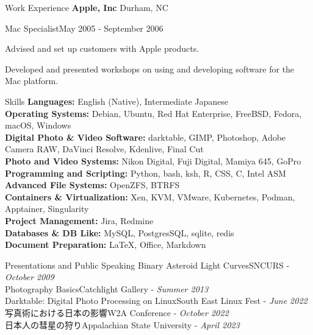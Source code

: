 \documentclass{new_cv} %
\begin{document}
\begin{rSection}{Work Experience}
  {\bf {Apple, Inc}} \hfill { Durham, NC}
   
    \begin{rSubsection}{Mac Specialist}{May 2005 - September 2006}
   	\item Advised and set up customers with Apple products.
   	\item Developed and presented workshops on using and developing software for the Mac platform.
   \end{rSubsection}
   
   \end{rSection}
   


\begin{rSection}{Skills}
	{\bf Languages:} English (Native),  Intermediate Japanese  \\
	{\bf Operating Systems:} Debian, Ubuntu, Red Hat Enterprise, FreeBSD, Fedora, macOS, Windows \\
	{\bf Digital Photo \& Video Software:}  darktable, GIMP, Photoshop, Adobe Camera RAW, DaVinci Resolve, Kdenlive, Final Cut \\
	{\bf Photo and Video Systems:} {Nikon Digital, Fuji Digital, Mamiya 645, GoPro } \\
	{\bf Programming and Scripting:}  Python, bash, ksh, R, CSS, C, Intel ASM \\
	{\bf Advanced File Systems:} OpenZFS, BTRFS \\
	{\bf Containers \& Virtualization:} Xen, KVM, VMware, Kubernetes, Podman, Apptainer, Singularity \\
	{\bf Project Management:} Jira, Redmine \\
	{\bf Databases \& DB Like:} MySQL, PostgresSQL, sqlite, redis \\
	{\bf Document Preparation:} \LaTeX, Office, Markdown
\end{rSection}

\pagebreak

\begin{rSection}
	{Presentations and Public Speaking}
	{Binary Asteroid Light Curves}\hfill{SNCURS - {\em October 2009}}\\
	{Photography Basics}\hfill{Catchlight Gallery - {\em Summer 2013}}\\
	{Darktable: Digital Photo Processing on Linux}\hfill{South East Linux Fest - {\em June 2022}}\\
	{写真術における日本の影響}\hfill{W2A Conference - {\em October 2022}}\\
	{日本人の彗星の狩り}\hfill{Appalachian State University - {\em April 2023}}
\end{rSection}
\end{document}
